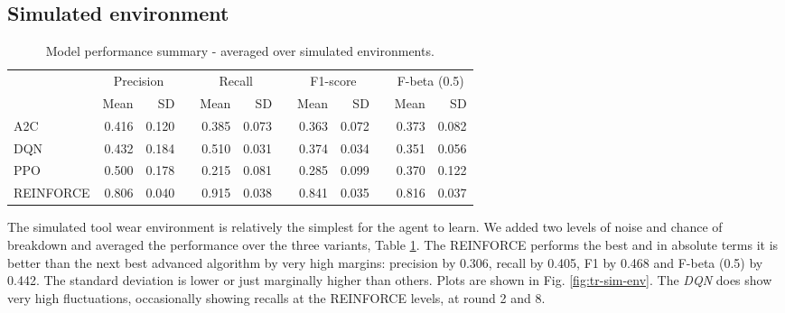 \documentclass[a4paper, 12pt]{article}
\newcommand{\rowspace}[1]{\renewcommand{\arraystretch}{#1}}
\begin{document}
\subsection{Simulated environment}
\begin{table}[!htb]\centering\sffamily
	\rowspace{1.3}
	\begin{tabular}{@{}l rr c rr c rr c rr@{}}
		\arrayrulecolor{black!40}\toprule
		& \multicolumn{2}{c}{Precision} & \phantom{i} & \multicolumn{2}{c}{Recall} & \phantom{i} & \multicolumn{2}{c}{F1-score} & \phantom{i} & \multicolumn{2}{c}{F-beta (0.5)} \\
		\cmidrule{2-3} \cmidrule{5-6} \cmidrule{8-9} \cmidrule{11-12} 
		
		&Mean &SD & &Mean &SD & &Mean &SD& &Mean & SD\\ \midrule
		A2C & 0.416 & 0.120 & &0.385 & 0.073 & & 0.363 & 0.072 & &0.373 &0.082 \\
		DQN & 0.432 & 0.184 & &0.510 & 0.031 & & 0.374 & 0.034 & &0.351 &0.056 \\
		PPO & 0.500 & 0.178 & &0.215 & 0.081 & & 0.285 & 0.099 & &0.370 &0.122 \\
		REINFORCE & 0.806 & 0.040 & &0.915 & 0.038 & & 0.841 & 0.035 & &0.816 &0.037 \\
		
		
		\bottomrule
	\end{tabular}
	\caption{Model performance summary - averaged over simulated environments.}
	\label{tbl:SimulatedEnv}
\end{table}
The simulated tool wear environment is relatively the simplest for the agent to learn. We added two levels of noise and chance of breakdown and averaged the performance over the three variants, Table \ref{tbl:SimulatedEnv}. The REINFORCE performs the best and in absolute terms it is better than the next best advanced algorithm by very high margins: precision by 0.306, recall by 0.405, F1 by 0.468 and F-beta (0.5) by 0.442. The standard deviation is lower or just marginally higher than others. Plots are shown in  Fig. \ref{fig:tr-sim-env}. The \textit{DQN} does show very high fluctuations, occasionally showing recalls at the REINFORCE levels, at round 2 and 8.
\end{document}
